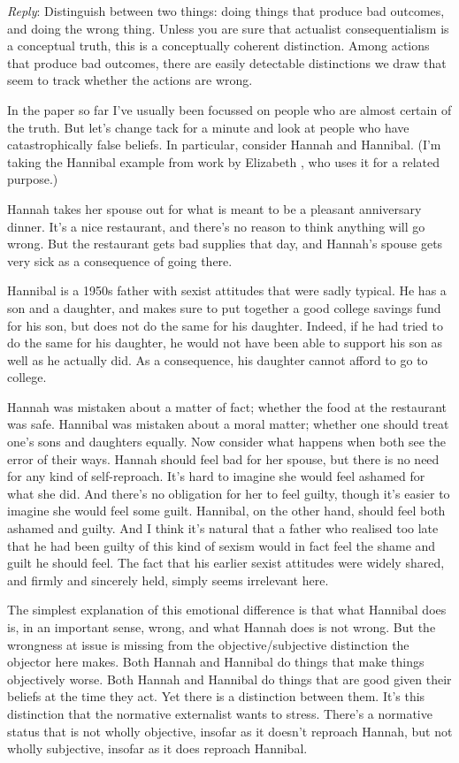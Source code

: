 \emph{Reply}: Distinguish between two things: doing things that produce bad outcomes, and doing the wrong thing. Unless you are sure that actualist consequentialism is a conceptual truth, this is a conceptually coherent distinction. Among actions that produce bad outcomes, there are easily detectable distinctions we draw that seem to track whether the actions are wrong.

In the paper so far I've usually been focussed on people who are almost certain of the truth. But let's change tack for a minute and look at people who have catastrophically false beliefs. In particular, consider Hannah and Hannibal. (I'm taking the Hannibal example from work by Elizabeth  \citet{EHarman2011}, who uses it for a related purpose.)

Hannah takes her spouse out for what is meant to be a pleasant anniversary dinner. It's a nice restaurant, and there's no reason to think anything will go wrong. But the restaurant gets bad supplies that day, and Hannah's spouse gets very sick as a consequence of going there.

Hannibal is a 1950s father with sexist attitudes that were sadly typical. He has a son and a daughter, and makes sure to put together a good college savings fund for his son, but does not do the same for his daughter. Indeed, if he had tried to do the same for his daughter, he would not have been able to support his son as well as he actually did. As a consequence, his daughter cannot afford to go to college.

Hannah was mistaken about a matter of fact; whether the food at the restaurant was safe. Hannibal was mistaken about a moral matter; whether one should treat one's sons and daughters equally. Now consider what happens when both see the error of their ways. Hannah should feel bad for her spouse, but there is no need for any kind of self-reproach. It's hard to imagine she would feel ashamed for what she did. And there's no obligation for her to feel guilty, though it's easier to imagine she would feel some guilt. Hannibal, on the other hand, should feel both ashamed and guilty. And I think it's natural that a father who realised too late that he had been guilty of this kind of sexism would in fact feel the shame and guilt he should feel. The fact that his earlier sexist attitudes were widely shared, and firmly and sincerely held, simply seems irrelevant here.

The simplest explanation of this emotional difference is that what Hannibal does is, in an important sense, wrong, and what Hannah does is not wrong. But the wrongness at issue is missing from the objective\slash subjective distinction the objector here makes. Both Hannah and Hannibal do things that make things objectively worse. Both Hannah and Hannibal do things that are good given their beliefs at the time they act. Yet there is a distinction between them. It's this distinction that the normative externalist wants to stress. There's a normative status that is not wholly objective, insofar as it doesn't reproach Hannah, but not wholly subjective, insofar as it does reproach Hannibal.

